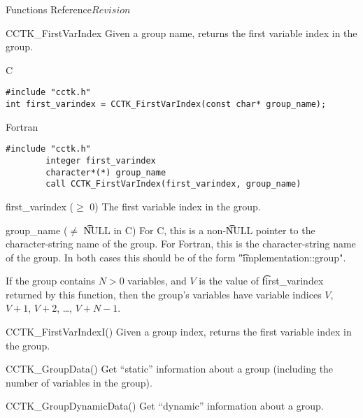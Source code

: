 \begin{cactuspart}{ Functions Reference}{}{$Revision$}


\begin{FunctionDescription}{CCTK\_FirstVarIndex}
\label{CCTK-FirstVarIndex}
Given a group name, returns the first variable index in the group.

\begin{SynopsisSection}
\begin{Synopsis}{C}
\begin{verbatim}
#include "cctk.h"
int first_varindex = CCTK_FirstVarIndex(const char* group_name);
\end{verbatim}
\end{Synopsis}
\begin{Synopsis}{Fortran}
\begin{verbatim}
#include "cctk.h"
        integer first_varindex
        character*(*) group_name
        call CCTK_FirstVarIndex(first_varindex, group_name)
\end{verbatim}
\end{Synopsis}
\end{SynopsisSection}

\begin{ResultSection}
\begin{Result}{first\_varindex ($\ge$ 0)}
The first variable index in the group.
\end{Result}
\end{ResultSection}

\begin{ParameterSection}
\begin{Parameter}{group\_name ($\ne$ {\t NULL} in C)}
For C, this is a non-{\t NULL} pointer to the character-string name
of the group.  For Fortran, this is the character-string name of the
group.  In both cases this should be of the form
{\t "implementation::group"}.
\end{Parameter}
\end{ParameterSection}

\begin{Discussion}
If the group contains $N > 0$ variables, and $V$ is the value of
{\t first\_varindex} returned by this function, then the group's
variables have variable indices $V$, $V+1$, $V+2$, \dots, $V+N-1$.
\end{Discussion}

\begin{SeeAlsoSection}
\begin{SeeAlso}{CCTK\_FirstVarIndexI()}
Given a group index, returns the first variable index in the group.
\end{SeeAlso}
\begin{SeeAlso}{CCTK\_GroupData()}
Get ``static'' information about a group
(including the number of variables in the group).
\end{SeeAlso}
\begin{SeeAlso}{CCTK\_GroupDynamicData()}
Get ``dynamic'' information about a group.
\end{SeeAlso}
\end{SeeAlsoSection}


\end{FunctionDescription}
\end{cactuspart}
